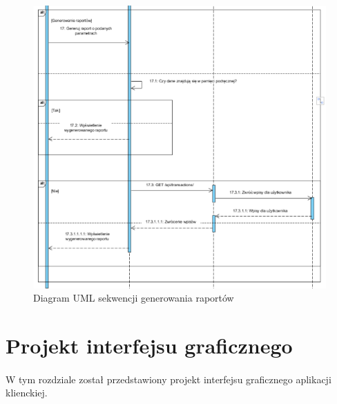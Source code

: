 \documentclass{article}
\begin{document}
	\begin{figure}[H]
		
		\hspace*{-1.5cm} 
		\includegraphics[scale=0.9]{assets/sq8.png}
		\caption[]{Diagram UML sekwencji generowania raportów}
		\label{fig:umlrap}
	\end{figure} 
	
	\section{Projekt interfejsu graficznego}
	\paragraph*{} W tym rozdziale został przedstawiony projekt interfejsu graficznego aplikacji klienckiej.
	
\end{document}
